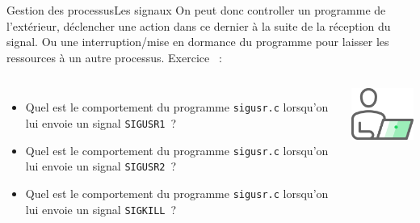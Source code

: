 \documentclass{beamer}
\begin{document}
    \begin{frame}{Gestion des processus}{Les signaux}
        On peut donc controller un programme de l'extérieur, déclencher une action dans ce dernier à la suite de la réception du signal.
        Ou une interruption/mise en dormance du programme pour laisser les ressources à un autre processus.
        \bigbreak
        Exercice \execcounterdispinc{}~:
        \begin{columns}
            \begin{itemize}
                \item Quel est le comportement du programme \lstinline{sigusr.c} lorsqu'on lui envoie un signal \lstinline{SIGUSR1}~?
                \item Quel est le comportement du programme \lstinline{sigusr.c} lorsqu'on lui envoie un signal \lstinline{SIGUSR2}~?
                \item Quel est le comportement du programme \lstinline{sigusr.c} lorsqu'on lui envoie un signal \lstinline{SIGKILL}~?
            \end{itemize}
            \centering
            \includegraphics[width=3cm]{image/guy-in-front-of-desktop}
        \end{columns}
    \end{frame}
\end{document}
